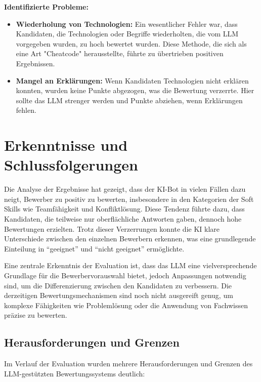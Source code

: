 \textbf{Identifizierte Probleme:}

\begin{itemize}
    \item \textbf{Wiederholung von Technologien:} Ein wesentlicher Fehler war, dass Kandidaten, die Technologien oder Begriffe wiederholten, die vom LLM vorgegeben wurden, zu hoch bewertet wurden. Diese Methode, die sich als eine Art "Cheatcode" herausstellte, führte zu übertrieben positiven Ergebnissen.
    \item \textbf{Mangel an Erklärungen:} Wenn Kandidaten Technologien nicht erklären konnten, wurden keine Punkte abgezogen, was die Bewertung verzerrte. Hier sollte das LLM strenger werden und Punkte abziehen, wenn Erklärungen fehlen.
\end{itemize}

\section{Erkenntnisse und Schlussfolgerungen}

Die Analyse der Ergebnisse hat gezeigt, dass der KI-Bot in vielen Fällen dazu neigt, Bewerber zu positiv zu bewerten, insbesondere in den Kategorien der Soft Skills wie Teamfähigkeit und Konfliktlösung. Diese Tendenz führte dazu, dass Kandidaten, die teilweise nur oberflächliche Antworten gaben, dennoch hohe Bewertungen erzielten. Trotz dieser Verzerrungen konnte die KI klare Unterschiede zwischen den einzelnen Bewerbern erkennen, was eine grundlegende Einteilung in \enquote{geeignet} und \enquote{nicht geeignet} ermöglichte.

Eine zentrale Erkenntnis der Evaluation ist, dass das LLM eine vielversprechende Grundlage für die Bewerbervorauswahl bietet, jedoch Anpassungen notwendig sind, um die Differenzierung zwischen den Kandidaten zu verbessern. Die derzeitigen Bewertungsmechanismen sind noch nicht ausgereift genug, um komplexe Fähigkeiten wie Problemlösung oder die Anwendung von Fachwissen präzise zu bewerten.

\subsection{Herausforderungen und Grenzen}

Im Verlauf der Evaluation wurden mehrere Herausforderungen und Grenzen des LLM-gestützten Bewertungssystems deutlich:

